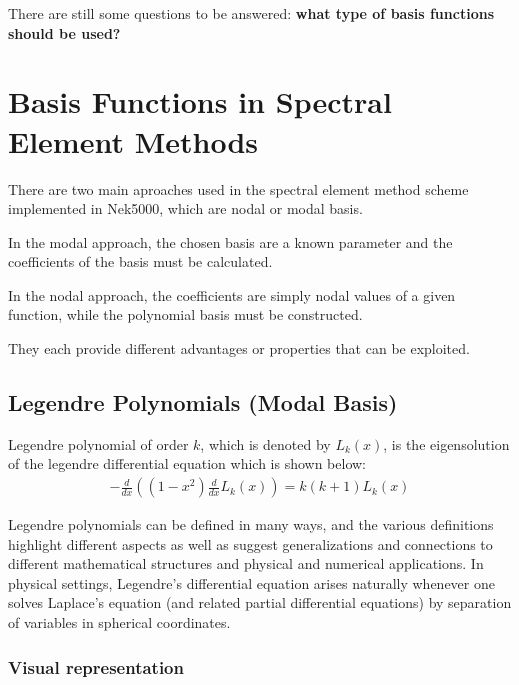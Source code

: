 \documentclass[
  a4paper,
  10pt]{article}
\begin{document}
There are still some questions to be answered: \textbf{what type of
basis functions should be used?}

\hypertarget{basis-functions-in-spectral-element-methods}{%
\section{Basis Functions in Spectral Element
Methods}\label{basis-functions-in-spectral-element-methods}}

There are two main aproaches used in the spectral element method scheme
implemented in Nek5000, which are nodal or modal basis.

In the modal approach, the chosen basis are a known parameter and the
coefficients of the basis must be calculated.

In the nodal approach, the coefficients are simply nodal values of a
given function, while the polynomial basis must be constructed.

They each provide different advantages or properties that can be
exploited.

\hypertarget{legendre-polynomials-modal-basis}{%
\subsection{Legendre Polynomials (Modal
Basis)}\label{legendre-polynomials-modal-basis}}

Legendre polynomial of order \(k\), which is denoted by \(L_k(x)\), is
the eigensolution of the legendre differential equation which is shown
below: \begin{align}
{\displaystyle {-\frac {d}{dx}}\left(\left(1-x^{2}\right){\frac {d}{dx}L_k(x)}\right)=k(k+1)L_k(x)}
\end{align}

Legendre polynomials can be defined in many ways, and the various
definitions highlight different aspects as well as suggest
generalizations and connections to different mathematical structures and
physical and numerical applications. In physical settings, Legendre's
differential equation arises naturally whenever one solves Laplace's
equation (and related partial differential equations) by separation of
variables in spherical coordinates.

\hypertarget{visual-representation}{%
\subsubsection{Visual representation}\label{visual-representation}}
\end{document}
